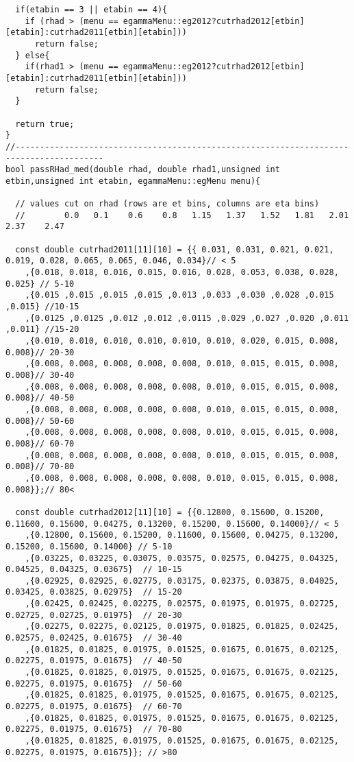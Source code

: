 \begin{lstlisting}
  if(etabin == 3 || etabin == 4){
    if (rhad > (menu == egammaMenu::eg2012?cutrhad2012[etbin][etabin]:cutrhad2011[etbin][etabin]))
      return false;
  } else{
    if(rhad1 > (menu == egammaMenu::eg2012?cutrhad2012[etbin][etabin]:cutrhad2011[etbin][etabin]))
      return false;
  }

  return true;
}
//----------------------------------------------------------------------------------------
bool passRHad_med(double rhad, double rhad1,unsigned int etbin,unsigned int etabin, egammaMenu::egMenu menu){
  
  // values cut on rhad (rows are et bins, columns are eta bins)
  //        0.0   0.1    0.6    0.8   1.15   1.37   1.52   1.81   2.01  2.37    2.47

  const double cutrhad2011[11][10] = {{ 0.031, 0.031, 0.021, 0.021, 0.019, 0.028, 0.065, 0.065, 0.046, 0.034}// < 5
	,{0.018, 0.018, 0.016, 0.015, 0.016, 0.028, 0.053, 0.038, 0.028, 0.025} // 5-10 
	,{0.015 ,0.015 ,0.015 ,0.015 ,0.013 ,0.033 ,0.030 ,0.028 ,0.015 ,0.015} //10-15
	,{0.0125 ,0.0125 ,0.012 ,0.012 ,0.0115 ,0.029 ,0.027 ,0.020 ,0.011 ,0.011} //15-20
	,{0.010, 0.010, 0.010, 0.010, 0.010, 0.010, 0.020, 0.015, 0.008, 0.008}// 20-30 
	,{0.008, 0.008, 0.008, 0.008, 0.008, 0.010, 0.015, 0.015, 0.008, 0.008}// 30-40 
	,{0.008, 0.008, 0.008, 0.008, 0.008, 0.010, 0.015, 0.015, 0.008, 0.008}// 40-50
	,{0.008, 0.008, 0.008, 0.008, 0.008, 0.010, 0.015, 0.015, 0.008, 0.008}// 50-60 
	,{0.008, 0.008, 0.008, 0.008, 0.008, 0.010, 0.015, 0.015, 0.008, 0.008}// 60-70 
	,{0.008, 0.008, 0.008, 0.008, 0.008, 0.010, 0.015, 0.015, 0.008, 0.008}// 70-80 
	,{0.008, 0.008, 0.008, 0.008, 0.008, 0.010, 0.015, 0.015, 0.008, 0.008}};// 80< 

  const double cutrhad2012[11][10] = {{0.12800, 0.15600, 0.15200, 0.11600, 0.15600, 0.04275, 0.13200, 0.15200, 0.15600, 0.14000}// < 5
	,{0.12800, 0.15600, 0.15200, 0.11600, 0.15600, 0.04275, 0.13200, 0.15200, 0.15600, 0.14000} // 5-10 
	,{0.03225, 0.03225, 0.03075, 0.03575, 0.02575, 0.04275, 0.04325, 0.04525, 0.04325, 0.03675}  // 10-15
	,{0.02925, 0.02925, 0.02775, 0.03175, 0.02375, 0.03875, 0.04025, 0.03425, 0.03825, 0.02975}  // 15-20
	,{0.02425, 0.02425, 0.02275, 0.02575, 0.01975, 0.01975, 0.02725, 0.02725, 0.02725, 0.01975}  // 20-30
	,{0.02275, 0.02275, 0.02125, 0.01975, 0.01825, 0.01825, 0.02425, 0.02575, 0.02425, 0.01675}  // 30-40
	,{0.01825, 0.01825, 0.01975, 0.01525, 0.01675, 0.01675, 0.02125, 0.02275, 0.01975, 0.01675}  // 40-50
	,{0.01825, 0.01825, 0.01975, 0.01525, 0.01675, 0.01675, 0.02125, 0.02275, 0.01975, 0.01675}  // 50-60
	,{0.01825, 0.01825, 0.01975, 0.01525, 0.01675, 0.01675, 0.02125, 0.02275, 0.01975, 0.01675}  // 60-70
	,{0.01825, 0.01825, 0.01975, 0.01525, 0.01675, 0.01675, 0.02125, 0.02275, 0.01975, 0.01675}  // 70-80
	,{0.01825, 0.01825, 0.01975, 0.01525, 0.01675, 0.01675, 0.02125, 0.02275, 0.01975, 0.01675}}; // >80
                                 


\end{lstlisting}
